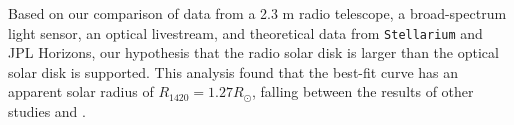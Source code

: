 Based on our comparison of data from a 2.3 m radio telescope, a broad-spectrum light sensor, an optical livestream, and theoretical data from \texttt{Stellarium} and JPL Horizons, our hypothesis that the radio solar disk is larger than the optical solar disk is supported.
This analysis found that the best-fit curve has an apparent solar radius of $R_{\mathrm{1420}} = 1.27 R_{\odot}$, falling between the results of other studies \cite{messerotti_radio_2000} and \cite{leung_solar_2022}.

